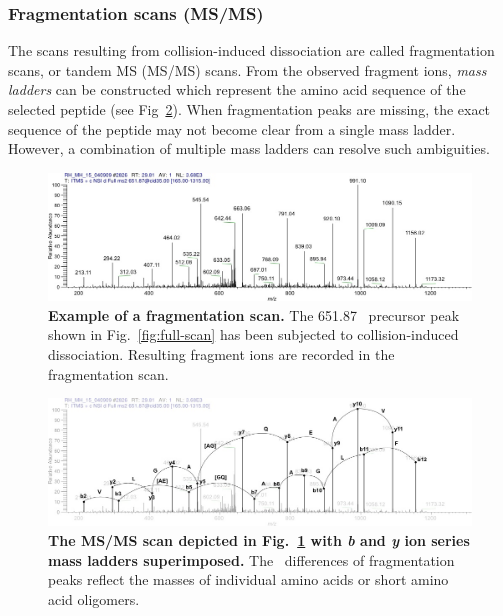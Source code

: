 \subsubsection{Fragmentation scans (MS/MS)}

The scans resulting from collision-induced dissociation are called 
fragmentation scans, or tandem MS (MS/MS) scans.
From the observed fragment ions, {\em mass ladders} can be constructed which
represent the amino acid sequence of the selected peptide (see Fig~\ref{fig:fragmentation-scan-b-y}). 
When fragmentation peaks are missing, the exact sequence of the peptide may not
become clear from a single mass ladder.
However, a combination of multiple mass ladders can resolve such ambiguities.

\begin{figure}[h]
\includegraphics[width=\textwidth]{figures/ms2-scan.jpg}
\caption{
{\bf Example of a fragmentation scan.} 
The 651.87 \mz~precursor peak shown in Fig.~\ref{fig:full-scan} has been
subjected to collision-induced dissociation.
Resulting fragment ions are recorded in the fragmentation scan.
}
\label{fig:fragmentation-scan}
\end{figure}

\begin{figure}[h]
\includegraphics[width=\textwidth]{figures/ms2-scan-b-y-1.jpg}
\caption{
{\bf The MS/MS scan depicted in Fig.~\ref{fig:fragmentation-scan} with {\em b} and 
{\em y} ion series mass ladders superimposed.} 
The \mz~differences of fragmentation peaks reflect the masses of individual amino
acids or short amino acid oligomers.
}
\label{fig:fragmentation-scan-b-y}
\end{figure}


